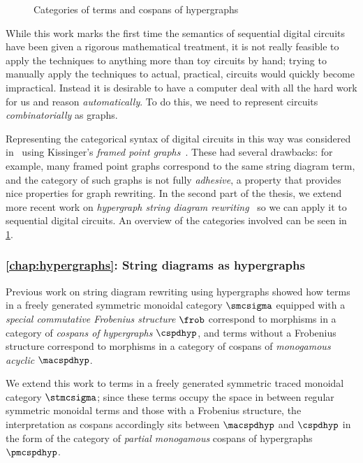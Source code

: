 \begin{figure}
    \centering
    
    \caption{Categories of terms and cospans of hypergraphs}
    \label{fig:hypergraphs-map}
\end{figure}

While this work marks the first time the semantics of sequential digital
circuits have been given a rigorous mathematical treatment, it is not really
feasible to apply the techniques to anything more than toy circuits by hand;
trying to manually apply the techniques to actual, practical, circuits would
quickly become impractical.
Instead it is desirable to have a computer deal with all the hard work
for us and reason \emph{automatically}.
To do this, we need to represent circuits \emph{combinatorially} as graphs.

Representing the categorical syntax of digital circuits in this way was
considered in~\cite{ghica2017diagrammatic} using
Kissinger's \emph{framed point graphs}~\cite{kissinger2012pictures}.
These had several drawbacks: for example, many framed point graphs correspond to
the same string diagram term, and the category of such graphs is not fully
\emph{adhesive}, a property that provides nice properties for graph rewriting.
In the second part of the thesis, we extend more recent work on
\emph{hypergraph string diagram rewriting}~\cite{bonchi2022string,bonchi2022stringa,bonchi2022stringb}
so we can apply it to sequential digital circuits.
An overview of the categories involved can be seen in
\cref{fig:hypergraphs-map}.

\subsubsection{\cref{chap:hypergraphs}: String diagrams as hypergraphs}

Previous work on string diagram rewriting using hypergraphs showed how terms
in a freely generated symmetric monoidal category \(\smcsigma\) equipped with a
\emph{special commutative Frobenius structure} \(\frob\) correspond to morphisms
in a category of \emph{cospans of hypergraphs} \(\cspdhyp\), and terms without a
Frobenius structure correspond to morphisms in a category of
cospans of \emph{monogamous acyclic} \(\macspdhyp\).

We extend this work to terms in a freely generated symmetric traced monoidal
category \(\stmcsigma\); since these terms occupy the space in between regular
symmetric monoidal terms and those with a Frobenius structure, the
interpretation as cospans accordingly sits between \(\macspdhyp\) and
\(\cspdhyp\) in the form of the category of \emph{partial monogamous} cospans of
hypergraphs \(\pmcspdhyp\).

